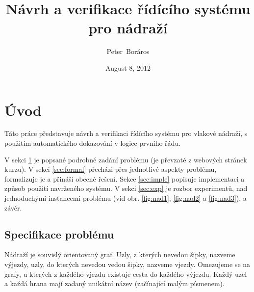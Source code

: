 \documentclass[a4paper,journal]{IEEEtran}
\begin{document}
\title{Návrh a verifikace řídícího systému pro nádraží}
\date{August 8, 2012}
\author{Peter~Boráros%
}%



\maketitle
\IEEEdisplaynotcompsoctitleabstractindextext
\IEEEpeerreviewmaketitle

\section{Úvod}\label{sec:intro}
Táto práce představuje návrh a verifikaci řídícího systému pro vlakové nádraží, s použitím automatického
dokazování v logice prvního řádu.

V sekci \ref{sec:intro} je popsané podrobné zadání problému (je převzaté z webových stránek kurzu). 
V sekci \ref{sec:formal} přecházi přes jednotlivé aspekty problému, formalizuje je a přináší obecné řešení. 
Sekce \ref{sec:imple} popisuje implementaci a způsob použití navrženého systému. V sekci 
\ref{sec:exp} je rozbor experimentů, nad jednoduchými instancemi problému (vid obr. 
\ref{fig:nad1}, \ref{fig:nad2} a \ref{fig:nad3}),
a závěr.

\subsection{Specifikace problému}
Nádraží je souvislý orientovaný graf. Uzly, z kterých nevedou šipky, nazveme výjezdy, uzly, 
do kterých nevedou vedou šipky, nazveme vjezdy. Omezujeme se na grafy, u kterých 
z každého vjezdu existuje cesta do každého výjezdu. Každý uzel a každá hrana mají 
zadaný unikátní název (začínající malým písmenem).
\end{document}
